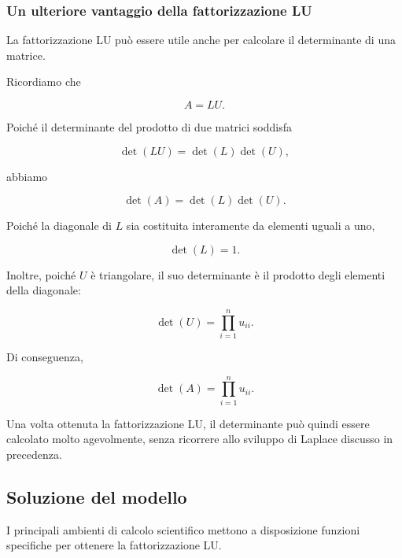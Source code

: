 \subsubsection{Un ulteriore vantaggio della fattorizzazione LU}

La fattorizzazione LU può essere utile anche per calcolare il
determinante di una matrice.

Ricordiamo che

\begin{equation*}
    A=LU.
\end{equation*}

Poiché il determinante del prodotto di due matrici soddisfa

\begin{equation*}
    \det(LU)=\det(L)\det(U),
\end{equation*}

abbiamo

\begin{equation*}
    \det(A)=\det(L)\det(U).
\end{equation*}

Poiché la diagonale di $L$ sia costituita interamente da
elementi uguali a uno,

\begin{equation*}
    \det(L)=1.
\end{equation*}

Inoltre, poiché $U$ è triangolare, il suo determinante è il prodotto
degli elementi della diagonale:

\begin{equation*}
    \det(U)=\prod_{i=1}^{n}u_{ii}.
\end{equation*}

Di conseguenza,

\begin{equation*}
    \det(A)=\prod_{i=1}^{n}u_{ii}.
    \label{eq:det-lu}
\end{equation*}

Una volta ottenuta la fattorizzazione LU, il determinante può quindi
essere calcolato molto agevolmente, senza ricorrere allo sviluppo
di Laplace discusso in precedenza.


\subsection{Soluzione del modello}

I principali ambienti di calcolo scientifico mettono a disposizione
funzioni specifiche per ottenere la fattorizzazione LU.

